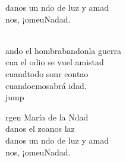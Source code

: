 \begin{cancion}
\begin{chorus}
	danos un ndo de luz y amad\\
	nos, ¡omeuNadad.\\
	\end{chorus}%
	\jump\\
	ando el hombrabandonla guerra\\
	cua el odio se vuel amistad\\
	cuandtodo sonr contao\\
	cuandoemosabrá idad.\\jump\\
	\begin{chorus}%
	rgen María de la Ndad\\
	danos el zoanos laz\\
	danos un ndo de luz y amad\\
	nos, ¡omeuNadad.\\
	\end{chorus}%
	\jump\\
\end{cancion}%
